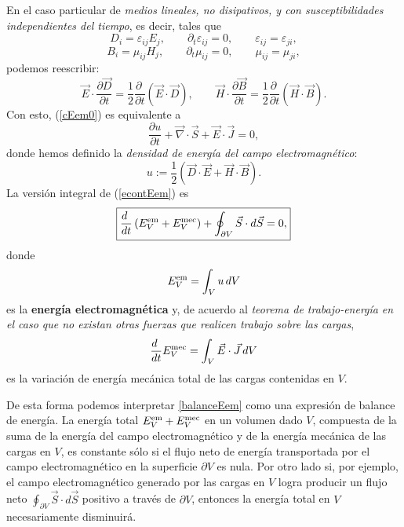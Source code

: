 En el caso particular de \textit{medios lineales, no disipativos, y con susceptibilidades
independientes del tiempo}, es decir, tales que
\begin{equation}
D_i=\varepsilon_{ij}E_j, \qquad \partial_t\varepsilon_{ij}=0, \qquad \varepsilon_{ij}=\varepsilon_{ji},
\end{equation}
\begin{equation}
B_i=\mu_{ij}H_j, \qquad \partial_t\mu_{ij}=0, \qquad \mu_{ij}=\mu_{ji},
\end{equation}
podemos reescribir:
\begin{equation}
 \vec{E}\cdot\frac{\partial \vec{D}}{\partial
t}=\frac{1}{2}\frac{\partial\ }{\partial t}\left(\vec{E}\cdot\vec{D}\right),
\qquad
 \vec{H}\cdot\frac{\partial \vec{B}}{\partial
t}=\frac{1}{2}\frac{\partial\ }{\partial t}\left(\vec{H}\cdot\vec{B}\right).
\end{equation}
Con esto, (\ref{cEem0}) es equivalente a
\begin{equation}
\boxed{\frac{\partial u}{\partial
t}+\vec\nabla\cdot\vec{S}+\vec{E}\cdot\vec{J}=0 ,} \label{econtEem}
\end{equation}
donde hemos definido la \textit{densidad de energía del campo
electromagnético}:
\begin{equation}\label{uDEHB}
\boxed{u:=\frac{1}{2}\left(\vec{D}\cdot\vec{E}+\vec{H}\cdot\vec{B}\right).}
\end{equation}
La versión integral de (\ref{econtEem}) es
\begin{equation}\label{balanceEem}
\boxed{\frac{d\ }{dt}\left(E^{\rm em}_V+E^{\rm mec}_V\right)+\oint_{\partial
V}\vec{S}\cdot d\vec{S}=0 ,}
\end{equation}
donde
\begin{equation}
E^{\rm em}_V=\int_V u\,dV
\end{equation}
es la \textbf{energía electromagnética} y, de acuerdo al \textit{teorema de trabajo-energía} \textit{en el caso que no existan otras fuerzas que realicen trabajo sobre las cargas},
\begin{equation}
 \frac{d\ }{dt}E^{\rm mec}_V=\int_V\vec{E}\cdot\vec{J}\,dV
\end{equation}
es la variación de energía mecánica total de las cargas contenidas en $V$.

De esta forma podemos interpretar \eqref{balanceEem} como una expresión de balance de energía. La energía total $E^{\rm em}_V+E^{\rm mec}_V$ en un volumen dado $V$, compuesta de la suma de la energía del campo electromagnético y de la energía mecánica de las cargas en $V$, es constante sólo si el flujo neto de energía transportada por el campo electromagnético en la superficie $\partial V$ es nula. Por otro lado si, por ejemplo, el campo electromagnético generado por las cargas en $V$ logra producir un flujo neto $\oint_{\partial V}\vec{S}\cdot d\vec{S}$ positivo a través de $\partial V$, entonces la energía total en $V$ necesariamente disminuirá.

